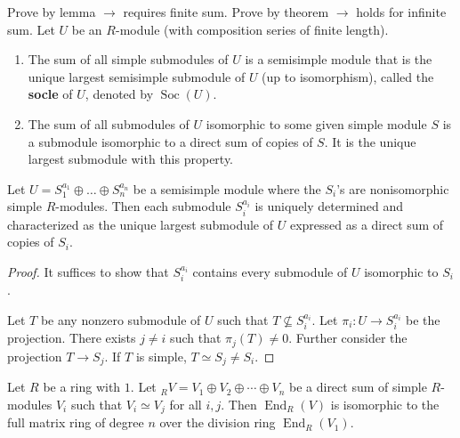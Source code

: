 \documentclass[11pt, a4paper]{report}
\begin{document}
\begin{definition}[Socle of $U$]
Prove by lemma $\rightarrow$ requires finite sum.
Prove by theorem $\rightarrow$ holds for infinite sum.
Let $U$ be an $R$-module (with composition series of finite length).
\begin{enumerate}
    \item The sum of all simple submodules of $U$ is a semisimple module that is the unique largest semisimple submodule of $U$ (up to isomorphism), called the \textbf{socle} of $U$, denoted by $\operatorname{Soc}(U)$.
    \item The sum of all submodules of $U$ isomorphic to some given simple module $S$ is a submodule isomorphic to a direct sum of copies of $S$. It is the unique largest submodule with this property.
\end{enumerate}
\end{definition}

\begin{corollary}
Let $U = S_{1}^{a_{1}} \oplus \dots \oplus S_{n}^{a_{n}}$ be a semisimple module where the $S_{i}$'s are nonisomorphic simple $R$-modules.
Then each submodule $S_{i}^{a_{i}}$ is uniquely determined and characterized as the unique largest submodule of $U$ expressed as a direct sum of copies of $S_{i}$.
\end{corollary}

\begin{proof}
It suffices to show that $S_{i}^{a_{i}}$ contains every submodule of $U$ isomorphic to $S_{i}$.

Let $T$ be any nonzero submodule of $U$ such that $T \nsubseteq S_{i}^{a_{i}}$.
Let $\pi_{i}: U \rightarrow S_{i}^{a_{i}}$ be the projection. There exists $j \neq i$ such that $\pi_{j}(T) \neq 0$.
Further consider the projection $T \rightarrow S_{j}$.
If $T$ is simple, $T \simeq S_{j} \neq S_{i}$.
\end{proof}
\begin{theorem}
Let $R$ be a ring with $1$. Let ${}_{R}V = V_{1} \oplus V_{2} \oplus \cdots \oplus V_{n}$ be a direct sum of simple $R$-modules $V_{i}$ such that $V_{i} \simeq V_{j}$ for all $i, j$. Then $\operatorname{End}_{R}(V)$ is isomorphic to the full matrix ring of degree $n$ over the division ring $\operatorname{End}_{R}(V_{1})$.
\end{theorem}
\end{document}
